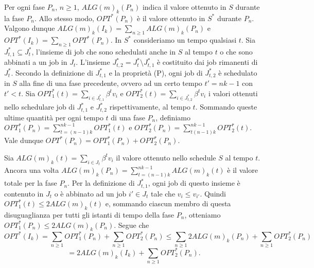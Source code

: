 \documentclass[twoside,openany,titlepage,fleqn,
	headinclude,12pt,a4paper,BCOR5mm,footinclude]{scrbook}
\begin{document}
Per ogni fase $P_{n}$, $n \geq 1$, $ALG(m)_{k}(P_{n})$ indica il valore ottenuto in $S$ durante la fase $P_{n}$. Allo stesso modo, $OPT^{*}(P_{n})$ è il valore ottenuto in $S^{*}$ durante $P_{n}$. Valgono dunque $ALG(m)_{k}(I_{k}) =  \sum_{n \geq 1} ALG(m)_{k}(P_{n})$ e $OPT^{*}(I_{k}) = \sum_{n \geq 1} OPT^{*}(P_{n})$. In $S^{*}$ consideriamo un tempo qualsiasi $t$. Sia $J_{t,1}^{*} \subseteq J_{t}^{*}$, l'insieme di job che sono schedulati anche in $S$ al tempo $t$ o che sono abbinati a un job in $J_{t}$. L'insieme $J_{t,2}^{*} = J_{t}^{*}\setminus J_{t,1}^{*}$ è costituito dai job rimanenti di $J_{t}^{*}$. Secondo la definizione di $J_{t,1}^{*}$ e la proprietà (P), ogni job di $J_{t,2}^{*}$ è schedulato in $S$ alla fine di una fase precedente, ovvero ad un certo tempo $t' = nk - 1$ con $t' <t$. Sia $OPT^{*}_{1}(t) = \sum_{i \in J_{t,1}^{*}} \beta^{t}v_{i}$ e $OPT^{*}_{2}(t) = \sum_{i \in J_{t,2}^{*}} \beta^{t} v_{i}$ i valori ottenuti nello schedulare job di $J_{t,1}^{*}$ e $J_{t,2}^{*}$ rispettivamente, al tempo $t$. Sommando queste ultime quantità per ogni tempo $t$ di una fase $P_{n}$, definiamo $OPT^{*}_{1}(P_{n}) = \sum^{nk - 1}_{t = (n - 1) k} OPT^{*}_{1}(t)$ e $OPT^{*}_{2}(P_{n}) = \sum^{nk- 1}_{t (n - 1) k} OPT^{*}_{2}(t)$. Vale dunque $OPT^{*}(P_{n}) = OPT^{*}_{1}(P_{n}) + OPT^{*}_{2}(P_{n}).$

Sia $ALG(m)_{k}(t) = \sum_{i \in J_{t}} \beta^{t}v_{i}$ il valore ottenuto nello schedule $S$ al tempo $t$. Ancora una volta $ALG(m)_{k}(P_{n}) = \sum^{nk - 1}_{t = (n - 1) k}ALG(m)_{k}(t)$ è il valore totale per la fase $P_{n}$. Per la definizione di $J_{t,1}^{*}$, ogni job di questo insieme è contenuto in $J_{t}$ o è abbinato ad un job $i' \in J_{t}$ tale che $v_{i} \leq v_{i'}$. Quindi $OPT^{*}_{1}(t) \leq 2ALG(m)_{k}(t)$ e, sommando ciascun membro di questa disuguaglianza per tutti gli istanti di tempo della fase $P_{n}$, otteniamo $OPT^{*}_{1}(P_{n}) \leq 2ALG(m)_{k}(P_{n})$. Segue che 
$$OPT^{*}(I_{k}) = \sum_{n \geq 1} OPT^{*}_{1}(P_{n}) + \sum_{n \geq 1}OPT^{*}_{2}(P_{n}) \leq \sum_{n \geq 1} 2ALG(m)_{k}(P_{n}) + \sum_{n \geq 1} OPT^{*}_{2}(P_{n})$$ 
$$= 2ALG(m)_{k}(I_{k}) + \sum_{n \geq 1} OPT^{*}_{2}(P_{n}).$$
\end{document}
